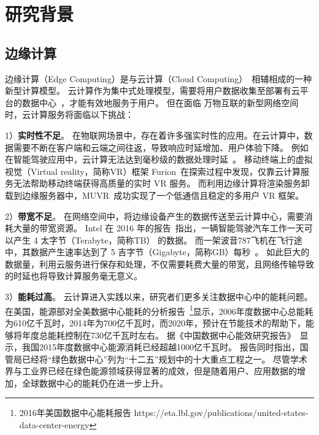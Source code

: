 
\section{研究背景}

\subsection{边缘计算}
边缘计算（Edge Computing）是与云计算（Cloud Computing）~\cite{DBLP:journals/cacm/ArmbrustFGJKKLPRSZ10}相辅相成的一种新型计算模型。
云计算作为集中式处理模型，需要将用户数据收集至部署有云平台的数据中心~\cite{DBLP:conf/icdcs/Montresor16}，才能有效地服务于用户。
但在面临 万物互联的新型网络空间时，云计算服务将面临以下挑战：

1）\textbf{实时性不足}。
在物联网场景中，存在着许多强实时性的应用。在云计算中，数据需要不断在客户端和云端之间往返，导致响应时延增加、用户体验下降。
例如在智能驾驶应用中，云计算无法达到毫秒级的数据处理时延~\cite{DBLP:conf/cvpr/GeigerLU12}。
移动终端上的虚拟视觉（Virtual reality，简称VR）框架 Furion~\cite{DBLP:conf/mobicom/LaiHCSD17}在探索过程中发现，仅靠云计算服务无法帮助移动终端获得高质量的实时 VR 服务。
而利用边缘计算将渲染服务卸载到边缘服务器中，MUVR~\cite{DBLP:conf/edge/LiG18}成功实现了一个低通信且稳定的多用户 VR 框架。

2）\textbf{带宽不足}。
在网络空间中，将边缘设备产生的数据传送至云计算中心，需要消耗大量的带宽资源。
Intel 在 2016 年的报告~\cite{DBLP:journals/micro/KatoTINTH15}指出，一辆智能驾驶汽车工作一天可以产生 4 太字节（Terabyte，简称TB） 的数据。
而一架波音787飞机在飞行途中，其数据产生速率达到了 5 吉字节（Gigabyte，简称GB）每秒~\cite{JCRD/shi17}。
如此巨大的数据量，利用云服务进行保存和处理，不仅需要耗费大量的带宽，且网络传输导致的时延也将导致计算服务毫无意义。

3）\textbf{能耗过高}。
云计算进入实践以来，研究者们更多关注数据中心中的能耗问题。
在美国，能源部对全美数据中心能耗的分析报告~\footnote{2016年美国数据中心能耗报告 https://eta.lbl.gov/publications/united-states-data-center-energy}显示，2006年度数据中心总能耗为610亿千瓦时，2014年为700亿千瓦时，而2020年，预计在节能技术的帮助下，能够将年度总能耗控制在730亿千瓦时左右。
据《中国数据中心能效研究报告》~\cite{whitebooks/cn15}显示，我国2015年度数据中心能源消耗已经超越1000亿千瓦时。
报告同时指出，国管局已经将“绿色数据中心”列为“十二五”规划中的十大重点工程之一。
尽管学术界与工业界已经在绿色能源领域获得显著的成效，但是随着用户、应用数据的增加，全球数据中心的能耗仍在进一步上升。

